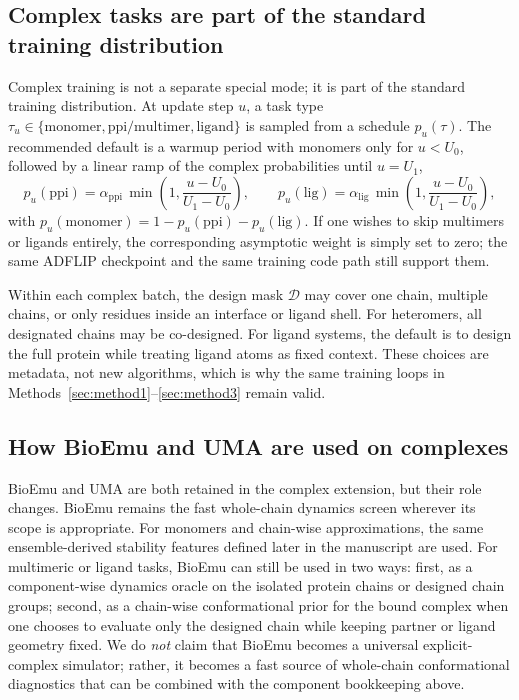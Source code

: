 \documentclass[11pt]{article}
\begin{document}
\subsection{Complex tasks are part of the standard training distribution}

Complex training is not a separate special mode; it is part of the standard training distribution. At update step $u$, a task type $\tau_u\in\{\text{monomer},\text{ppi/multimer},\text{ligand}\}$ is sampled from a schedule $p_u(\tau)$. The recommended default is a warmup period with monomers only for $u<U_0$, followed by a linear ramp of the complex probabilities until $u=U_1$,
\begin{equation}
    p_u(\text{ppi}) = \alpha_{\mathrm{ppi}}\,\min\!\left(1,\frac{u-U_0}{U_1-U_0}\right), \qquad
    p_u(\text{lig}) = \alpha_{\mathrm{lig}}\,\min\!\left(1,\frac{u-U_0}{U_1-U_0}\right),
\end{equation}
with $p_u(\text{monomer})=1-p_u(\text{ppi})-p_u(\text{lig})$. If one wishes to skip multimers or ligands entirely, the corresponding asymptotic weight is simply set to zero; the same ADFLIP checkpoint and the same training code path still support them.

Within each complex batch, the design mask $\mathcal{D}$ may cover one chain, multiple chains, or only residues inside an interface or ligand shell. For heteromers, all designated chains may be co-designed. For ligand systems, the default is to design the full protein while treating ligand atoms as fixed context. These choices are metadata, not new algorithms, which is why the same training loops in Methods~\ref{sec:method1}--\ref{sec:method3} remain valid.

\subsection{How BioEmu and UMA are used on complexes}

BioEmu and UMA are both retained in the complex extension, but their role changes. BioEmu remains the fast whole-chain dynamics screen wherever its scope is appropriate. For monomers and chain-wise approximations, the same ensemble-derived stability features defined later in the manuscript are used. For multimeric or ligand tasks, BioEmu can still be used in two ways: first, as a component-wise dynamics oracle on the isolated protein chains or designed chain groups; second, as a chain-wise conformational prior for the bound complex when one chooses to evaluate only the designed chain while keeping partner or ligand geometry fixed. We do \emph{not} claim that BioEmu becomes a universal explicit-complex simulator; rather, it becomes a fast source of whole-chain conformational diagnostics that can be combined with the component bookkeeping above.
\end{document}
